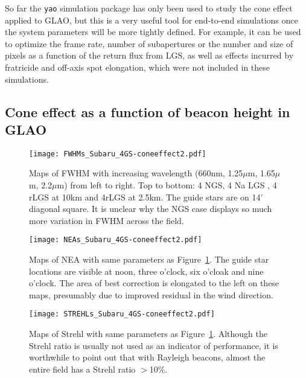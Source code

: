 \documentclass[aas_macros,10pt]{article}
\begin{document}
So far the \texttt{yao} simulation package has only been used to study the cone effect applied to GLAO, but this is a very useful tool for end-to-end simulations once the system parameters will be more tightly defined. For example, it can be used to optimize the frame rate, number of subapertures or the number and size of pixels as a function of the return flux from LGS, as well as effects incurred by fratricide and off-axis spot elongation, which were not included in these simulations.

\subsection{Cone effect as a function of beacon height in GLAO}

\begin{figure}[ht]
\centering
\texttt{[image: FWHMs\_Subaru\_4GS-coneeffect2.pdf]}
\caption{Maps of FWHM with increasing wavelength (660nm, 1.25$\mu$m, 1.65$\mu$m, 2.2$\mu$m) from left to right. Top to bottom: 4 NGS, 4 Na LGS , 4 rLGS at 10km and 4rLGS at 2.5km. The guide stars are  on 14' diagonal square. It is unclear why the NGS case displays so much more variation in FWHM across the field.}
\label{fig:coneeffect_FWHM}
\end{figure}

\begin{figure}[ht]
\centering
\texttt{[image: NEAs\_Subaru\_4GS-coneeffect2.pdf]}
\caption{Maps of NEA with same parameters as Figure~\ref{fig:coneeffect_FWHM}. The guide star locations are visible at noon, three o'clock, six o'cloak and nine o'clock. The area of best correction is elongated to the left on these maps, presumably due to improved residual in the wind direction.}
\label{fig:coneeffect_NEA}
\end{figure}

\begin{figure}[ht]
\centering
\texttt{[image: STREHLs\_Subaru\_4GS-coneeffect2.pdf]}
\caption{Maps of Strehl with same parameters as Figure~\ref{fig:coneeffect_FWHM}. Although the Strehl ratio is usually not used as an indicator of performance, it is worthwhile to point out that with Rayleigh beacons, almost the entire field has a Strehl ratio $>$10\%.}
\label{fig:coneeffect_STREHL}
\end{figure}
\end{document}
